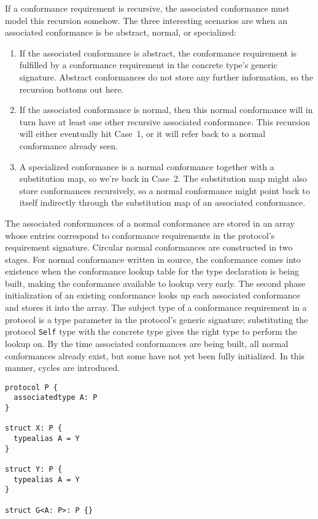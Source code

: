 \documentclass[a4paper,headsepline,bibliography=totoc,toc=flat,fleqn,twoside=semi]{scrbook}
\theoremstyle{definition}
\theoremstyle{definition}
\theoremstyle{definition}
\begin{document}
If a conformance requirement is recursive, the associated conformance must model this recursion somehow. The three interesting scenarios are when an associated conformance is be abstract, normal, or specialized:
\begin{enumerate}
\item If the associated conformance is abstract, the conformance requirement is fulfilled by a conformance requirement in the concrete type's generic signature. Abstract conformances do not store any further information, so the recursion bottoms out here.

\item If the associated conformance is normal, then this normal conformance will in turn have at least one other recursive associated conformance. This recursion will either eventually hit Case~1, or it will refer back to a normal conformance already seen.

\item A specialized conformance is a normal conformance together with a substitution map, so we're back in Case~2. The substitution map might also store conformances recursively, so a normal conformance might point back to itself indirectly through the substitution map of an associated conformance.
\end{enumerate}

The associated conformances of a normal conformance are stored in an array whose entries correspond to conformance requirements in the protocol's requirement signature. Circular normal conformances are constructed in two stages. For normal conformance written in source, the conformance comes into existence when the conformance lookup table for the type declaration is being built, making the conformance available to lookup very early. The second phase initialization of an existing conformance looks up each associated conformance and stores it into the array. The subject type of a conformance requirement in a protocol is a type parameter in the protocol's generic signature; substituting the protocol \texttt{Self} type with the concrete type gives the right type to perform the lookup on. By the time associated conformances are being built, all normal conformances already exist, but some have not yet been fully initialized. In this manner, cycles are introduced.

\begin{listing}\label{recursive conformance basic}
\begin{Verbatim}
protocol P {
  associatedtype A: P
}

struct X: P {
  typealias A = Y
}

struct Y: P {
  typealias A = Y
}

struct G<A: P>: P {}
\end{Verbatim}
\end{listing}
\end{document}
